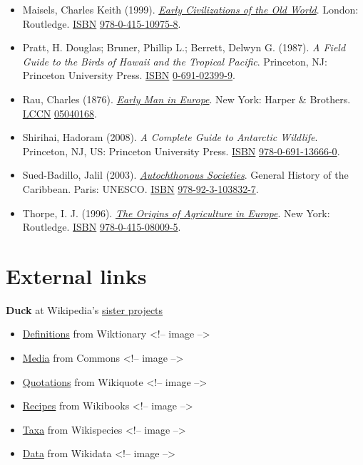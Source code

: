 \documentclass[11pt,a4paper]{article}
\begin{document}
\begin{itemize}
\item Maisels, Charles Keith (1999). \href{https://books.google.com/books?id=I2dgI2ijww8C\&pg=PA42}{\textit{Early Civilizations of the Old World}}. London: Routledge. \href{/wiki/ISBN\_\%28identifier\%29}{ISBN} \href{/wiki/Special:BookSources/978-0-415-10975-8}{978-0-415-10975-8}.
\item Pratt, H. Douglas; Bruner, Phillip L.; Berrett, Delwyn G. (1987). \textit{A Field Guide to the Birds of Hawaii and the Tropical Pacific}. Princeton, NJ: Princeton University Press. \href{/wiki/ISBN\_\%28identifier\%29}{ISBN} \href{/wiki/Special:BookSources/0-691-02399-9}{0-691-02399-9}.
\item Rau, Charles (1876). \href{https://books.google.com/books?id=9XBgAAAAIAAJ\&pg=133}{\textit{Early Man in Europe}}. New York: Harper \& Brothers. \href{/wiki/LCCN\_\%28identifier\%29}{LCCN} \href{https://lccn.loc.gov/05040168}{05040168}.
\item Shirihai, Hadoram (2008). \textit{A Complete Guide to Antarctic Wildlife}. Princeton, NJ, US: Princeton University Press. \href{/wiki/ISBN\_\%28identifier\%29}{ISBN} \href{/wiki/Special:BookSources/978-0-691-13666-0}{978-0-691-13666-0}.
\item Sued-Badillo, Jalil (2003). \href{https://books.google.com/books?id=zexcW7q-4LgC\&pg=PA65}{\textit{Autochthonous Societies}}. General History of the Caribbean. Paris: UNESCO. \href{/wiki/ISBN\_\%28identifier\%29}{ISBN} \href{/wiki/Special:BookSources/978-92-3-103832-7}{978-92-3-103832-7}.
\item Thorpe, I. J. (1996). \href{https://books.google.com/books?id=YA-EAgAAQBAJ\&pg=PA68}{\textit{The Origins of Agriculture in Europe}}. New York: Routledge. \href{/wiki/ISBN\_\%28identifier\%29}{ISBN} \href{/wiki/Special:BookSources/978-0-415-08009-5}{978-0-415-08009-5}.
\end{itemize}

\section{External links}

\textbf{Duck} at Wikipedia's \href{/wiki/Wikipedia:Wikimedia\_sister\_projects}{sister projects}

\begin{itemize}
\item \href{https://en.wiktionary.org/wiki/duck}{Definitions} from Wiktionary
<!-- image -->
\item \href{https://commons.wikimedia.org/wiki/Anatidae}{Media} from Commons
<!-- image -->
\item \href{https://en.wikiquote.org/wiki/Birds}{Quotations} from Wikiquote
<!-- image -->
\item \href{https://en.wikibooks.org/wiki/Cookbook:Duck}{Recipes} from Wikibooks
<!-- image -->
\item \href{https://species.wikimedia.org/wiki/Anatidae}{Taxa} from Wikispecies
<!-- image -->
\item \href{https://www.wikidata.org/wiki/Q3736439}{Data} from Wikidata
<!-- image -->
\end{itemize}
\end{document}
